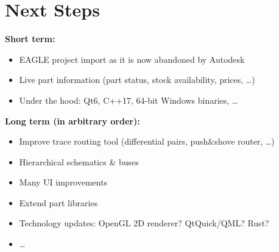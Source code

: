 \section{Next Steps}

\begin{frame}{\secname}
  \textbf{Short term:}
  \begin{itemize}
    \item EAGLE project import as it is now abandoned by Autodesk
    \item Live part information (part status, stock availability, prices,
          \ldots)
    \item Under the hood: Qt6, C++17, 64-bit Windows binaries, \ldots
  \end{itemize}

  \bigskip

  \textbf{Long term (in arbitrary order):}
  \begin{itemize}
    \item Improve trace routing tool (differential pairs, push\&shove router,
          \ldots)
    \item Hierarchical schematics \& buses
    \item Many UI improvements
    \item Extend part libraries
    \item Technology updates: OpenGL 2D renderer? QtQuick/QML? Rust?
    \item \ldots
  \end{itemize}
\end{frame}
